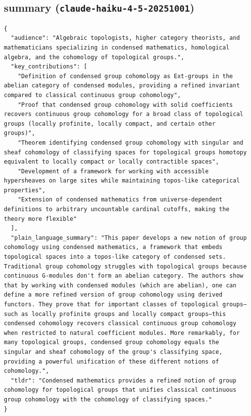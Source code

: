 \documentclass[11pt]{article}
\begin{document}
\subsection*{summary (\texttt{claude-haiku-4-5-20251001})}
\begin{verbatim}
{
  "audience": "Algebraic topologists, higher category theorists, and mathematicians specializing in condensed mathematics, homological algebra, and the cohomology of topological groups.",
  "key_contributions": [
    "Definition of condensed group cohomology as Ext-groups in the abelian category of condensed modules, providing a refined invariant compared to classical continuous group cohomology",
    "Proof that condensed group cohomology with solid coefficients recovers continuous group cohomology for a broad class of topological groups (locally profinite, locally compact, and certain other groups)",
    "Theorem identifying condensed group cohomology with singular and sheaf cohomology of classifying spaces for topological groups homotopy equivalent to locally compact or locally contractible spaces",
    "Development of a framework for working with accessible hypersheaves on large sites while maintaining topos-like categorical properties",
    "Extension of condensed mathematics from universe-dependent definitions to arbitrary uncountable cardinal cutoffs, making the theory more flexible"
  ],
  "plain_language_summary": "This paper develops a new notion of group cohomology using condensed mathematics, a framework that embeds topological spaces into a topos-like category of condensed sets. Traditional group cohomology struggles with topological groups because continuous G-modules don't form an abelian category. The authors show that by working with condensed modules (which are abelian), one can define a more refined version of group cohomology using derived functors. They prove that for important classes of topological groups—such as locally profinite groups and locally compact groups—this condensed cohomology recovers classical continuous group cohomology when restricted to natural coefficient modules. More remarkably, for many topological groups, condensed group cohomology equals the singular and sheaf cohomology of the group's classifying space, providing a powerful unification of these different notions of cohomology.",
  "tldr": "Condensed mathematics provides a refined notion of group cohomology for topological groups that unifies classical continuous group cohomology with the cohomology of classifying spaces."
}
\end{verbatim}
\end{document}
